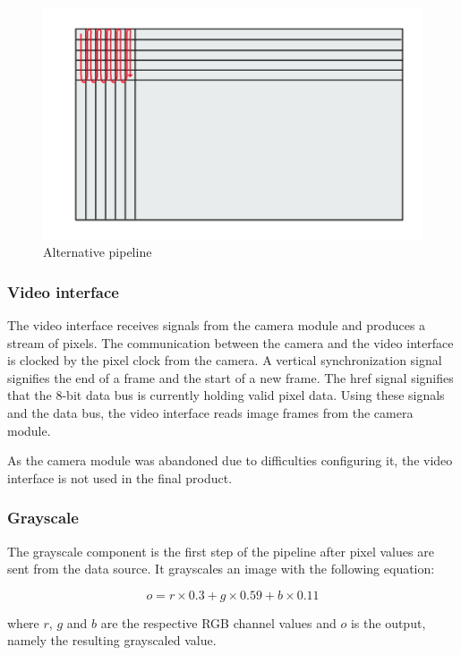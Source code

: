 \begin{figure}
    \centering
    \includegraphics[scale=0.75]{Images/alternative_pipline.png}
    \caption{Alternative pipeline}
    \label{fig:Alt_Pipe}
\end{figure}

\subsubsection{Video interface}
The video interface receives signals from the camera module and produces a stream of pixels. The communication between the camera and the video interface is clocked by the pixel clock from the camera. A vertical synchronization 
signal signifies the end of a frame and the start of a new frame. The href signal signifies that the 8-bit data bus is currently holding valid pixel data. Using these signals and the data bus, the video interface reads image frames from the camera module.

As the camera module was abandoned due to difficulties configuring it, the video interface is not used in the final product.

\subsubsection{Grayscale}
The grayscale component is the first step of the pipeline after pixel values are sent from the data source. It grayscales an image with the following equation:

\begin{equation}
    o = r \times 0.3 + g \times 0.59 + b \times 0.11
\end{equation}

where $r$, $g$ and $b$ are the respective RGB channel values and $o$ is the output, namely the resulting grayscaled value.

